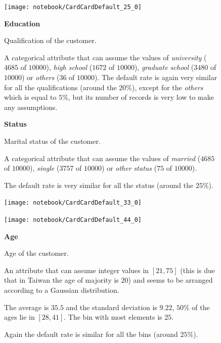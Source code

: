\documentclass[11pt,a4paper]{report}
\begin{document}
\smallskip
\begin{figure}[h]
  \begin{minipage}[h]{.45\textwidth}
	  \texttt{[image: notebook/CardCardDefault\_25\_0]}
  \end{minipage}
  \begin{minipage}[h]{.50\textwidth}
        {\Large \textbf{Education}}
        
        Qualification of the customer.
        
        A categorical attribute that can assume the values of 
        \textit{university} ($4685$ of $10000$),
        \textit{high school} ($1672$ of $10000$),
        \textit{graduate school} ($3480$ of $10000$) or
        \textit{others} ($36$ of $10000$).
        The default rate is again very similar for all the qualifications (around the $20\%$), except for the \textit{others} which is equal to $5\%$, but its number of records is very low to make any assumptions.
  \end{minipage}
\end{figure}
\smallskip
\begin{figure}[h]
  \begin{minipage}[h]{.50\textwidth}
        {\Large \textbf{Status}}
        
        Marital status of the customer.
        
        A categorical attribute that can assume the values of 
        \textit{married} ($4685$ of $10000$),
        \textit{single} ($3757$ of $10000$) or
        \textit{other status} ($75$ of $10000$).
        
        The default rate is very similar for all the status (around the $25\%$).
  \end{minipage}
  \begin{minipage}[h]{.45\textwidth}
	  \texttt{[image: notebook/CardCardDefault\_33\_0]}
  \end{minipage}
\end{figure}

\smallskip
\begin{figure}[h]
  \begin{minipage}[h]{.45\textwidth}
	  \texttt{[image: notebook/CardCardDefault\_44\_0]}
  \end{minipage}
  \begin{minipage}[h]{.50\textwidth}
        {\Large \textbf{Age}}
        
        Age of the customer.
        
        An attribute that can assume integer values in $[21, 75]$ (this is due that in Taiwan the age of majority is $20$) and seems to be arranged according to a Gaussian distribution.
        
        The average is $35.5$ and the standard deviation is $9.22$, $50\%$ of the ages lie in $[28, 41]$.
        The bin with most elements is $25$.
        
        Again the default rate is similar for all the bins (around $25\%$).
  \end{minipage}
\end{figure}
\end{document}
